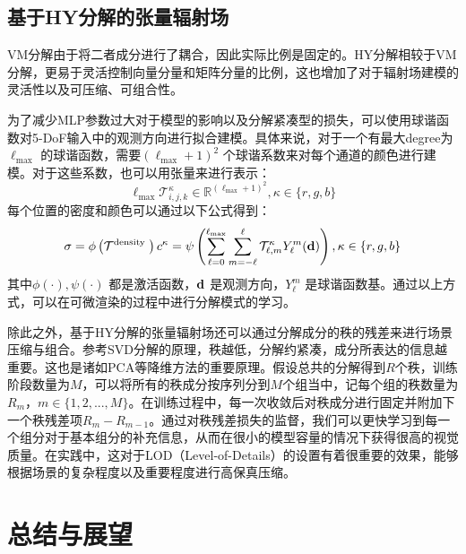 \documentclass[10pt,twocolumn,letterpaper]{article}
\begin{document}
\subsection{基于HY分解的张量辐射场}

VM分解由于将二者成分进行了耦合，因此实际比例是固定的。HY分解相较于VM分解，更易于灵活控制向量分量和矩阵分量的比例，这也增加了对于辐射场建模的灵活性以及可压缩、可组合性。

为了减少MLP参数过大对于模型的影响以及分解紧凑型的损失，可以使用球谐函数对5-DoF输入中的观测方向进行拟合建模。具体来说，对于一个有最大degree为$\ell_{\max}$ 的球谐函数，需要$(\ell_{\max}+1)^2$ 个球谐系数来对每个通道的颜色进行建模。对于这些系数，也可以用张量来进行表示：
\begin{equation}
  \ell_{\max }\mathcal{T}_{i, j, k}^{\kappa} \in \mathbb{R}^{\left(\ell_{\max }+1\right)^{2}}, \kappa \in\{r, g, b\}
\end{equation}
\label{eq:11}
每个位置的密度和颜色可以通过以下公式得到：
\begin{equation}
  \sigma=\phi\left(\mathcal{T}^{\text {density }}\right) \\ c^{\kappa}=\psi\left(\sum_{\ell=0}^{\ell_{\max }} \sum_{m=-\ell}^{\ell} \mathcal{T}_{\ell, m}^{\kappa} Y_{\ell}^{m}(\mathbf{d})\right), \kappa \in\{r, g, b\}
\end{equation}
\label{eq:12}
其中$\phi(\cdot),\psi(\cdot)$ 都是激活函数，$\bold d$ 是观测方向，$Y^m_{\ell}$ 是球谐函数基。通过以上方式，可以在可微渲染的过程中进行分解模式的学习。

除此之外，基于HY分解的张量辐射场还可以通过分解成分的秩的残差来进行场景压缩与组合。参考SVD分解的原理，秩越低，分解约紧凑，成分所表达的信息越重要。这也是诸如PCA等降维方法的重要原理。假设总共的分解得到$R$个秩，训练阶段数量为$M$，可以将所有的秩成分按序列分到$M$个组当中，记每个组的秩数量为$R_m$，$m\in\{1,2,...,M\}$。在训练过程中，每一次收敛后对秩成分进行固定并附加下一个秩残差项$R_m-R_{m-1}$。通过对秩残差损失的监督，我们可以更快学习到每一个组分对于基本组分的补充信息，从而在很小的模型容量的情况下获得很高的视觉质量。在实践中，这对于LOD（Level-of-Details）的设置有着很重要的效果，能够根据场景的复杂程度以及重要程度进行高保真压缩。

\section{总结与展望}
\label{sec:conclusion}


{\small


}
\end{document}

